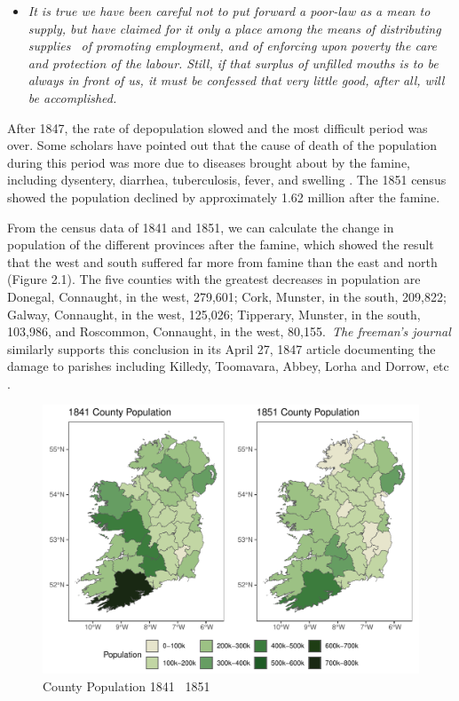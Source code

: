 \begin{itemize}
    \item [] \textit{It is true we have been careful not to put forward a poor-law as a mean to supply, but have claimed for it only a place among the means of distributing supplies \textendash\ of promoting employment, and of enforcing upon poverty the care and protection of the labour. Still, if that surplus of unfilled mouths is to be always in front of us, it must be confessed that very little good, after all, will be accomplished.} \citep{thomas1847poorlaw}
\end{itemize}

After 1847, the rate of depopulation slowed and the most difficult period was over. Some scholars have pointed out that the cause of death of the population during this period was more due to diseases brought about by the famine, including dysentery, diarrhea, tuberculosis, fever, and swelling \citep{mokyr2002people}. The 1851 census showed the population declined by approximately 1.62 million after the famine.

From the census data of 1841 and 1851, we can calculate the change in population of the different provinces after the famine, which showed the result that the west and south suffered far more from famine than the east and north  (Figure 2.1). The five counties with the greatest decreases in population are Donegal, Connaught, in the west, 279,601; Cork, Munster, in the south, 209,822; Galway, Connaught, in the west, 125,026; Tipperary, Munster, in the south, 103,986, and Roscommon, Connaught, in the west, 80,155.\ \textit{The freeman's journal} similarly supports this conclusion in its April 27, 1847 article documenting the damage to parishes including Killedy, Toomavara, Abbey, Lorha and Dorrow, etc \citep{freeman1847parishes}. 

\begin{figure}[htbp]
    \centering
    \caption{County Population 1841 \textendash\ 1851}
    \includegraphics[width=\textwidth]{../03_outputs/map1841_1851.pdf}
\end{figure}

